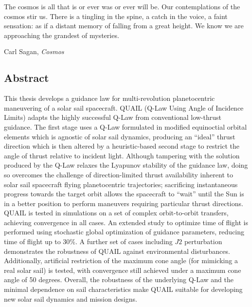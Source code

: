 \begin{titlepage}
  
\end{titlepage}

\epigraph{
  The cosmos is all that is or ever was or ever will be. Our contemplations of the cosmos stir us. There is a tingling in the spine, a catch in the voice, a faint sensation: as if a distant memory of falling from a great height. We know we are approaching the grandest of mysteries.}{Carl Sagan, \textit{Cosmos}}

\newpage

\vspace*{\fill}
\begin{center}
  \section*{Abstract}
\end{center}
This thesis develops a guidance law for multi-revolution planetocentric maneuvering of a solar sail spacecraft. QUAIL (Q-Law Using Angle of Incidence Limits) adapts the highly successful Q-Law from conventional low-thrust guidance. The first stage uses a Q-Law formulated in modified equinoctial orbital elements which is agnostic of solar sail dynamics, producing an ``ideal'' thrust direction which is then altered by a heuristic-based second stage to restrict the angle of thrust relative to incident light. Although tampering with the solution produced by the Q-Law relaxes the Lyapunov stability of the guidance law, doing so overcomes the challenge of direction-limited thrust availability inherent to solar sail spacecraft flying planetocentric trajectories; sacrificing instantaneous progress towards the target orbit allows the spacecraft to ``wait'' until the Sun is in a better position to perform maneuvers requiring particular thrust directions. QUAIL is tested in simulations on a set of complex orbit-to-orbit transfers, achieving convergence in all cases. An extended study to optimize time of flight is performed using stochastic global optimization of guidance parameters, reducing time of flight up to 30\%. A further set of cases including \(J2\) perturbation demonstrates the robustness of QUAIL against environmental disturbances. Additionally, artificial restriction of the maximum cone angle (for mimicking a real solar sail) is tested, with convergence still achieved under a maximum cone angle of 50 degrees. Overall, the robustness of the underlying Q-Law and the minimal dependence on sail characteristics make QUAIL suitable for developing new solar sail dynamics and mission designs.

